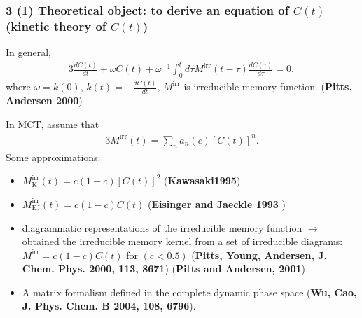 \documentclass[8pt]{beamer}
\begin{document}
\begin{frame}
	\frametitle{3 (1) Theoretical object: to derive an equation of $C(t)$ (kinetic theory of $C(t)$)}
	In general,
	\begin{alignat}{3}
		\frac{dC(t)}{dt} + \omega C(t) + \omega^{-1} \int_0^t d\tau M^\text{irr}(t-\tau) \frac{dC(\tau)}{d\tau} = 0,
	\end{alignat}
where $\omega = k(0)$, $k(t) = -\frac{dC(t)}{dt}$, $M^\text{irr}$ is irreducible memory function.  (\textbf{Pitts, Andersen 2000})

In MCT, assume that
\begin{alignat}{3}
M^\text{irr}(t)=\sum_n a_n(c) [C(t)]^n. 
\end{alignat}
Some approximations:
\begin{itemize}
	\item  $M^\text{irr}_\text{K}(t) = c(1-c) [C(t)]^2$ (\textbf{Kawasaki1995})
	\item  $M^\text{irr}_\text{EJ}(t) = c(1-c) C(t) $ (\textbf{Eisinger and Jaeckle 1993} )
	\item diagrammatic representations of the irreducible memory function $\to$ obtained the irreducible memory kernel from a set of irreducible diagrams: $M^\text{irr} = c(1-c) C(t)$ for $(c< 0.5)$ (\textbf{Pitts, Young, Andersen, J. Chem. Phys. 2000, 113, 8671})
	 (\textbf{Pitts and Andersen, 2001})
	 \item A matrix formalism defined in the complete dynamic phase space (\textbf{Wu, Cao, J. Phys. Chem. B 2004, 108, 6796}).%
\end{itemize}	
\end{frame}

	
		
\end{document}
